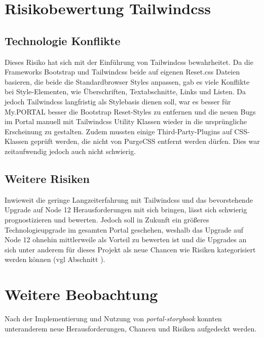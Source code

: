 \section{Risikobewertung Tailwindcss}
\subsection{Technologie Konflikte}
Dieses Risiko hat sich mit der Einführung von Tailwindcss bewahrheitet. Da die Frameworks Bootstrap und Tailwindcss beide auf eigenen Reset.css Dateien basieren, die beide die Standardbrowser Styles anpassen, gab es viele Konflikte bei Style-Elementen, wie Überschriften, Textabschnitte, Links und Listen. Da jedoch Tailwindcss langfristig als Stylebasis dienen soll, war es besser für My.PORTAL besser die Bootstrap Reset-Styles zu entfernen und die neuen Bugs im Portal manuell mit Tailwindcss Utility Klassen wieder in die ursprüngliche Erscheinung zu gestalten. Zudem mussten einige Third-Party-Plugins auf CSS-Klassen geprüft werden, die nicht von PurgeCSS entfernt werden dürfen. Dies war zeitaufwendig jedoch auch nicht schwierig.

\subsection{Weitere Risiken}
Inwieweit die geringe Langzeiterfahrung mit Tailwindcss und das bevorstehende Upgrade auf Node 12 Herausforderungen mit sich bringen, lässt sich schwierig prognostizieren und bewerten. Jedoch soll in Zukunft ein größeres Technologieupgrade im gesamten Portal geschehen, weshalb das Upgrade auf Node 12 ohnehin mittlerweile als Vorteil zu bewerten ist und die Upgrades an sich unter anderem für dieses Projekt als neue Chancen wie Risiken kategorisiert werden können (vgl Abschnitt ).

\section{Weitere Beobachtung}
Nach der Implementierung und Nutzung von \textit{portal-storybook} konnten unteranderem neue Herausforderungen, Chancen und Risiken aufgedeckt werden.
